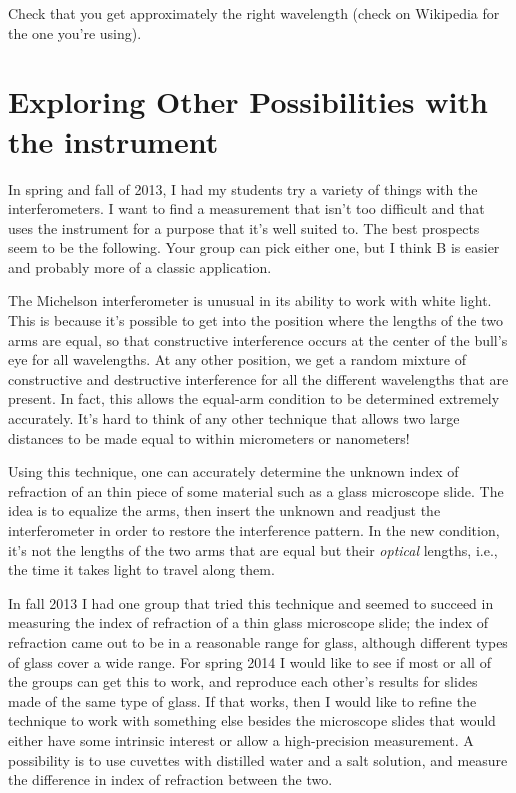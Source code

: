 Check that you get approximately the right wavelength (check on Wikipedia for the
one you're using).

\section*{Exploring Other Possibilities with the instrument}

In spring and fall of 2013, I had my students try a variety of things with the interferometers.
I want to find a measurement that isn't too difficult and that uses the instrument for a
purpose that it's well suited to. The best prospects seem to be the following.
Your group can pick either one, but I think B is easier and probably more of
a classic application.


The Michelson interferometer is unusual in its ability to work with white light.
This is because it's possible to get into the position where the lengths of the
two arms are equal, so that constructive interference occurs at the center of
the bull's eye for all wavelengths. At any other position, we get
a random mixture of constructive and destructive interference for all the different
wavelengths that are present. In fact, this allows the equal-arm condition
to be determined extremely accurately. It's hard to think of any other technique
that allows two large distances to be made equal to within micrometers or nanometers!

Using this technique, one can accurately determine the unknown index of refraction of an
thin piece of some material such as a glass microscope slide. The idea is to equalize
the arms, then insert the unknown and readjust the interferometer in order to
restore the interference pattern. In the new condition, it's not the lengths of the
two arms that are equal but their \emph{optical} lengths, i.e., the time it takes
light to travel along them.

In fall 2013 I had one group that tried this technique and
seemed to succeed in measuring the index of refraction of a thin glass microscope slide;
the index of refraction came out to be in a reasonable range for glass, although different
types of glass cover a wide range. For spring 2014 I would like to see if most or all
of the groups can get this to work, and reproduce each other's results for slides made
of the same type of glass. If that works, then I would like to refine the technique to
work with something else besides the microscope slides that would either have some
intrinsic interest or allow a high-precision measurement. A possibility is to use
cuvettes with distilled water and a salt solution, and measure the difference in
index of refraction between the two.

